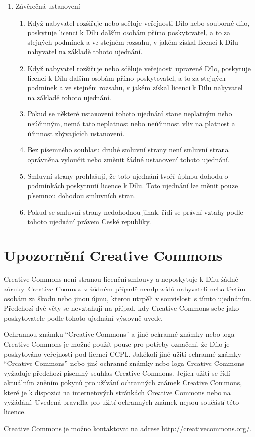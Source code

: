 \begin{enumerate}
  \item Závěrečná ustanovení
    \begin{enumerate}
      \item Když nabyvatel rozšiřuje nebo sděluje veřejnosti Dílo nebo souborné dílo, poskytuje licenci k Dílu dalším osobám přímo poskytovatel, a to za stejných podmínek a ve stejném rozsahu, v jakém získal licenci k Dílu nabyvatel na základě tohoto ujednání.
      \item Když nabyvatel rozšiřuje nebo sděluje veřejnosti upravené Dílo, poskytuje licenci k Dílu dalším osobám přímo poskytovatel, a to za stejných podmínek a ve stejném rozsahu, v jakém získal licenci k Dílu nabyvatel na základě tohoto ujednání.
      \item Pokud se některé ustanovení tohoto ujednání stane neplatným nebo neúčinným, nemá tato neplatnost nebo neúčinnost vliv na platnost a účinnost zbývajících ustanovení.
      \item Bez písemného souhlasu druhé smluvní strany není smluvní strana oprávněna vyloučit nebo změnit žádné ustanovení tohoto ujednání.
      \item Smluvní strany prohlašují, že toto ujednání tvoří úplnou dohodu o podmínkách poskytnutí licence k Dílu. Toto ujednání lze měnit pouze písemnou dohodou smluvních stran.
      \item Pokud se smluvní strany nedohodnou jinak, řídí se právní vztahy podle tohoto ujednání právem České republiky.
    \end{enumerate}
\end{enumerate}

\section{Upozornění Creative Commons}

Creative Commons není stranou licenční smlouvy a neposkytuje k Dílu žádné záruky. Creative Commos v žádném případě neodpovídá nabyvateli nebo třetím osobám za škodu nebo jinou újmu, kterou utrpěli v souvislosti s tímto ujednáním. Předchozí dvě věty se nevztahují na případ, kdy Creative Commons sebe jako poskytovatele podle tohoto ujednání výslovně uvede.

Ochrannou známku ``Creative Commons'' a jiné ochranné známky nebo loga Creative Commons je možné použít pouze pro potřeby označení, že Dílo je poskytováno veřejnosti pod licencí CCPL. Jakékoli jiné užití ochranné známky ``Creative Commons'' nebo jiné ochranné známky nebo loga Creative Commons vyžaduje předchozí písemný souhlas Creative Commons. Jejich užití se řídí aktuálním zněním pokynů pro užívání ochranných známek Creative Commons, které je k dispozici na internetových stránkách Creative Commons nebo na vyžádání. Uvedená pravidla pro užití ochranných známek nejsou součástí této licence.

Creative Commons je možno kontaktovat na adrese http://creativecommons.org/.
